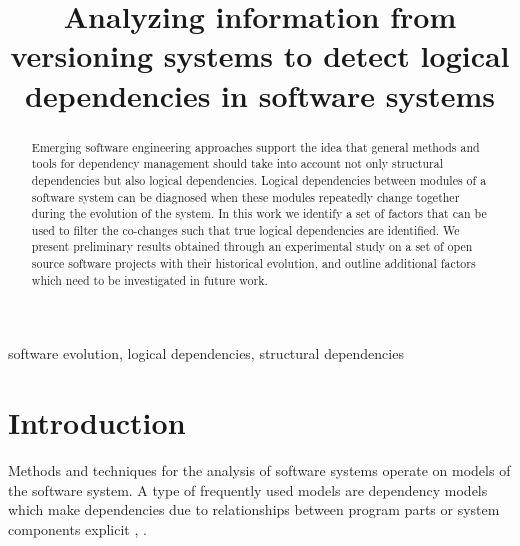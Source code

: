 \documentclass[conference]{IEEEtran}
\begin{document}
\title{Analyzing information from versioning systems to detect logical dependencies in software systems}

\author{
\and
{}

}


\maketitle

\begin{abstract}
Emerging software engineering approaches support the idea that general methods and tools for dependency management should take into account not only structural dependencies but also logical dependencies. Logical dependencies between modules of a software system can be diagnosed when these modules repeatedly change together during the evolution of the system.  In this work we identify a set of factors that can be used to filter the co-changes such that true logical dependencies are identified. We present preliminary results obtained through an experimental study on a set of open source software projects with their historical evolution, and outline additional factors which need to be investigated in future work.
\end{abstract}

\begin{IEEEkeywords}
software evolution, logical dependencies, structural dependencies
\end{IEEEkeywords}

\section{Introduction}


Methods and techniques for the analysis of software systems operate on models of the software system. A type of frequently used models are dependency models which make dependencies due to relationships between program parts or system components explicit \cite{CalloArias2011}, \cite{Sangal:2005:UDM:1094811.1094824}.
\end{document}
